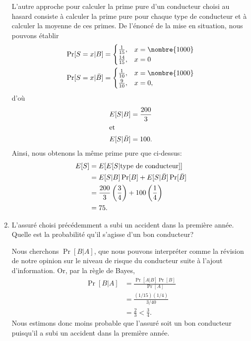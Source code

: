 \begin{enumerate}
  L'autre approche pour calculer la prime pure d'un conducteur choisi
  au hasard consiste à calculer la prime pure pour chaque type
  de conducteur et à calculer la moyenne de ces primes. De l'énoncé de
  la mise en situation, nous pouvons établir
  \begin{align*}
    \Pr[S = x|B]
    &=
      \begin{cases}
        \frac{1}{15}, & x = \nombre{1000} \\
        \frac{14}{15}, & x = 0
      \end{cases} \\
    \Pr[S = x|\bar{B}]
    &=
      \begin{cases}
        \frac{1}{10}, & x = \nombre{1000} \\
        \frac{9}{10}, & x = 0,
      \end{cases}
  \end{align*}
  d'où
  \begin{align*}
    E [ S|B ] &= \frac{200}{3} \\
    \intertext{et}
    E [ S|\bar{B} ] &= 100.
  \end{align*}
  Ainsi, nous obtenons la même prime pure que ci-dessus:
    \begin{align*}
      E [ S ]
      &= E [ E [ S|\text{type de conducteur} ] ] \\
      &= E [ S|B ] \Pr[B] + E [ S|\bar{B} ] \Pr[\bar{B}] \\
      &= \frac{200}{3} \left( \frac{3}{4} \right)
        + 100 \left( \frac{1}{4} \right) \\
      &= 75.
    \end{align*}

\item L'assuré choisi précédemment a subi un accident dans la première
  année. Quelle est la probabilité qu'il s'agisse d'un bon conducteur?

  Nous cherchons $\Pr[B|A]$, que nous pouvons interpréter comme la
  révision de notre opinion sur le niveau de risque du conducteur
  suite à l'ajout d'information. Or, par la règle de Bayes,
  \begin{align*}
    \Pr[B|A]
    &= \frac{\Pr[A|B] \Pr[B]}{\Pr[A]} \\
    &= \frac{(1/15) (1/4)}{3/40} \\
    &= \frac{2}{3} < \frac{3}{4}.
  \end{align*}
  Nous estimons donc moins probable que l'assuré soit un bon
  conducteur puisqu'il a subi un accident dans la première année.


\end{enumerate}
